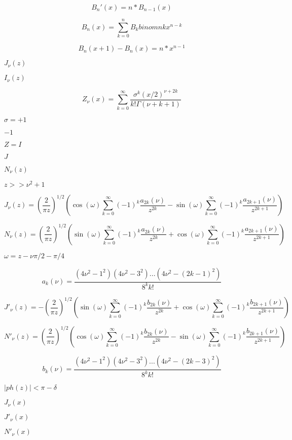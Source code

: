 \documentclass{article}
\begin{document}
\[ B_n'(x) = n * B_{n-1}(x) \]
\pagebreak

\[ B_n(x) = \sum_{k=0}^{n} B_k binom{n}{k} x^{n-k} \]
\pagebreak

\[ B_n(x+1) - B_n(x) = n * x^{n-1} \]
\pagebreak

$ J_{\nu}(z) $
\pagebreak

$ I_{\nu}(z) $
\pagebreak

\[ Z_{\nu}(x) = \sum_{k=0}^{\infty} \frac{\sigma^k (x/2)^{\nu + 2k}}{k!\Gamma(\nu+k+1)} \]
\pagebreak

$ \sigma = +1 $
\pagebreak

$ -1 $
\pagebreak

$ Z = I $
\pagebreak

$ J $
\pagebreak

$ N_{\nu}(z) $
\pagebreak

$ z >> \nu^2 + 1 $
\pagebreak

\[ J_{\nu}(z) = \left(\frac{2}{\pi z}\right)^{1/2} \left( \cos(\omega)\sum_{k=0}^{\infty}(-1)^k\frac{a_{2k}(\nu)}{z^{2k}} - \sin(\omega)\sum_{k=0}^{\infty}(-1)^k\frac{a_{2k+1}(\nu)}{z^{2k+1}} \right) \]
\pagebreak

\[ N_{\nu}(z) = \left(\frac{2}{\pi z}\right)^{1/2} \left( \sin(\omega)\sum_{k=0}^{\infty}(-1)^k\frac{a_{2k}(\nu)}{z^{2k}} + \cos(\omega)\sum_{k=0}^{\infty}(-1)^k\frac{a_{2k+1}(\nu)}{z^{2k+1}} \right) \]
\pagebreak

$ \omega = z - \nu\pi/2 - \pi/4 $
\pagebreak

\[ a_{k}(\nu) = \frac{(4\nu^2 - 1^2)(4\nu^2 - 3^2)...(4\nu^2 - (2k-1)^2)} {8^k k!} \]
\pagebreak

\[ J'_{\nu}(z) = -\left(\frac{2}{\pi z}\right)^{1/2} \left( \sin(\omega)\sum_{k=0}^{\infty}(-1)^k\frac{b_{2k}(\nu)}{z^{2k}} + \cos(\omega)\sum_{k=0}^{\infty}(-1)^k\frac{b_{2k+1}(\nu)}{z^{2k+1}} \right) \]
\pagebreak

\[ N'_{\nu}(z) = \left(\frac{2}{\pi z}\right)^{1/2} \left( \cos(\omega)\sum_{k=0}^{\infty}(-1)^k\frac{b_{2k}(\nu)}{z^{2k}} - \sin(\omega)\sum_{k=0}^{\infty}(-1)^k\frac{b_{2k+1}(\nu)}{z^{2k+1}} \right) \]
\pagebreak

\[ b_{k}(\nu) = \frac{(4\nu^2 - 1^2)(4\nu^2 - 3^2)...(4\nu^2 - (2k-3)^2)} {8^k k!} \]
\pagebreak

$ |ph(z)| < \pi - \delta $
\pagebreak

$ J_\nu(x) $
\pagebreak

$ J'_\nu(x) $
\pagebreak

$ N'_\nu(x) $
\pagebreak
\end{document}
